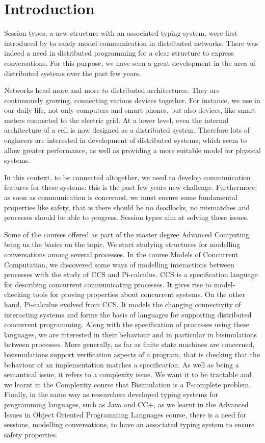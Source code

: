\documentclass[a4paper,11pt,twoside]{report}
\begin{document}
\tableofcontents


\chapter*{Introduction}
Session types, a new structure with an associated typing system, were first introduced by \cite{honda1998language} to safely model communication in distributed networks. There was indeed a need in distributed programming for a clear structure to express conversations. For this purpose, we have seen a great development in the area of distributed systems over the past few years.

Networks head more and more to distributed architectures. They are continuously growing, connecting various devices together.  For instance, we use in our daily life, not only computers and smart phones, but also devices, like smart meters connected to the electric grid. At a lower level, even the internal architecture of a cell is now designed as a distributed system. Therefore lots of engineers are interested in development of distributed systems, which seem to allow greater performance, as well as providing a more suitable model for physical systems.

In this context, to be connected altogether, we need to develop communication features for these systems: this is the past few years new challenge. Furthermore, as soon as communication is concerned, we must ensure some fundamental properties like safety, that is there should be no deadlocks, no mismatches and processes should be able to progress. Session types aim at solving these issues.

Some of the courses offered as part of the master degree Advanced Computing bring us the basics on the topic. We start studying structures for modelling conversations among several processes. In the course Models of Concurrent Computation, we discovered some ways of modelling interactions between processes with the study of CCS and Pi-calculus. CCS is a specification language for describing concurrent communicating processes. It gives rise to model-checking tools for proving properties about concurrent systems. On the other hand, Pi-calculus evolved from CCS. It models the changing connectivity of interacting systems and forms the basis of languages for supporting distributed concurrent programming. Along with the specification of processes using these languages, we are interested in their behaviour and in particular in bisimulations between processes. More generally, as far as finite state machines are concerned, bisismulations support verification aspects of a program, that is checking that the behaviour of an implementation matches a specification. As well as being a semantical issue, it refers to a complexity issue. We want it to be tractable and we learnt in the Complexity course that Bisimulation is a P-complete problem. Finally, in the same way as researchers developed typing systems for programming languages, such as Java and CC+, as we learnt in the Advanced Issues in Object Oriented Programming Languages course, there is a need for sessions, modelling conversations, to have an associated typing system to ensure safety properties.
\end{document}
